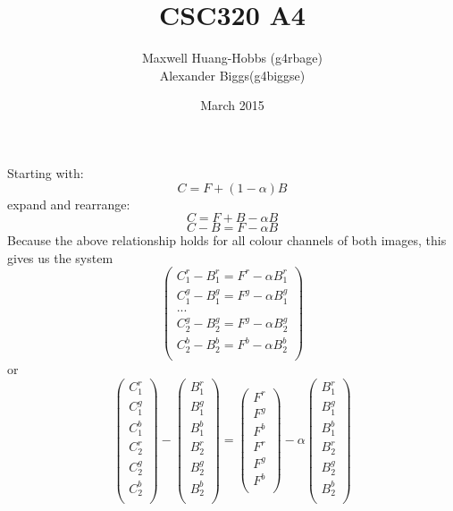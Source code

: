\documentclass[11pt]{article}
\title{CSC320 A4}
\author{Maxwell Huang-Hobbs (g4rbage)\\Alexander Biggs(g4biggse)}
\date{March 2015}
\begin{document}
\maketitle
\begin{center}
Starting with:  
$$C=F + (1-\alpha)B$$
expand and rearrange:\\
$$C=F + B- \alpha B$$
$$C-B=F - \alpha B$$
Because the above relationship holds for all colour channels of both images, this gives us the system
$$\begin{pmatrix}
C^{r}_1 - B^{r}_1 = F^{r} -\alpha B^{r}_1\\
C^{g}_1 - B^{g}_1 = F^{g} -\alpha B^{g}_1\\
...\\
C^{g}_2 - B^{g}_2 = F^{g} -\alpha B^{g}_2\\
C^{b}_2 - B^{b}_2 = F^{b} -\alpha B^{b}_2\\
\end{pmatrix}$$
or
$$\begin{pmatrix}
  C^{r}_1\\
  C^{g}_1\\
  C^{b}_1\\
  C^{r}_2\\
  C^{g}_2\\
  C^{b}_2\\
\end{pmatrix}
-\begin{pmatrix}
  B^{r}_1 \\
  B^{g}_1 \\
  B^{b}_1 \\
  B^{r}_2 \\
  B^{g}_2 \\
  B^{b}_2 \\
\end{pmatrix}
=
\begin{pmatrix}
  F^{r} \\
  F^{g} \\
  F^{b} \\
  F^{r} \\
  F^{g} \\
  F^{b} \\
\end{pmatrix}
-
\alpha
\begin{pmatrix}
  B^{r}_1 \\
  B^{g}_1 \\
  B^{b}_1 \\
  B^{r}_2 \\
  B^{g}_2 \\
  B^{b}_2 \\
\end{pmatrix}
$$


\end{center}
\end{document}
